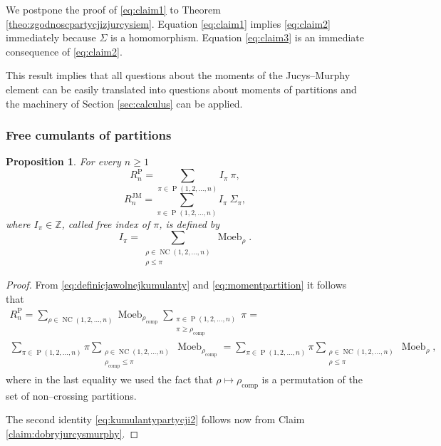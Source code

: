 \documentclass[12pt,dvips]{amsart}
\numberwithin{equation}{section} \numberwithin{figure}{section}
\theoremstyle{plain}
\newtheorem{proposition}[lemma]{Proposition}
\theoremstyle{definition}
\theoremstyle{remark}
\newcommand{\Z}{{\mathbb{Z}}}
\newcommand{\Mpp}{M^{\pp}}
\newcommand{\RJM}{R^{\JM}}
\newcommand{\Rpp}{R^{\pp}}
\DeclareMathOperator{\comp}{comp}
\DeclareMathOperator{\JM}{JM}
\DeclareMathOperator{\pp}{P}
\DeclareMathOperator{\PP}{P}
\DeclareMathOperator{\NC}{NC}
\DeclareMathOperator{\Moeb}{Moeb}
\begin{document}
We postpone the proof of \eqref{eq:claim1} to Theorem
\ref{theo:zgodnoscpartycjizjurcysiem}. Equation \eqref{eq:claim1}
implies \eqref{eq:claim2} immediately because  $\Sigma$ is a
homomorphism. Equation \eqref{eq:claim3} is an immediate consequence
of \eqref{eq:claim2}.

This result implies that all questions about the moments of the
Jucys--Murphy element can be easily translated into questions about
moments of partitions and the machinery of Section
\ref{sec:calculus} can be applied.





\subsubsection{Free cumulants of partitions}



\begin{proposition}  For every $n\geq 1$
\begin{equation}
\label{eq:kumulantypartycji} \Rpp_n=\sum_{\pi\in\PP(1,2,\dots,n)}
I_{\pi} \  \pi,
\end{equation}
\begin{equation}
\label{eq:kumulantypartycji2} \RJM_n=\sum_{\pi\in\PP(1,2,\dots,n)}
I_{\pi} \  \Sigma_\pi,
\end{equation}
where $I_{\pi}\in\Z$, called  free index
of $\pi$, is defined by
\begin{equation}
\label{eq:formulanakrotnosc}
I_{\pi}=\sum_{\substack{\rho\in\NC(1,2,\dots,n) \\ \rho\leq \pi}}
\Moeb_{\rho}.
\end{equation}
\end{proposition}
\begin{proof} From \eqref{eq:definicjawolnejkumulanty} and
\eqref{eq:momentpartition} it follows that
\begin{multline*}
\Rpp_n=\sum_{\rho\in\NC(1,2,\dots,n)} \Moeb_{\rho_{\comp}}
\sum_{\substack{\pi\in\PP(1,2,\dots,n)\\ \pi\geq \rho_{\comp}} }
\pi=\\
\sum_{\pi\in\PP(1,2,\dots,n)} \pi
\sum_{\substack{\rho\in\NC(1,2,\dots,n) \\ \rho_{\comp} \leq \pi}}
\Moeb_{\rho_{\comp}}= \sum_{\pi\in\PP(1,2,\dots,n)} \pi
\sum_{\substack{\rho\in\NC(1,2,\dots,n) \\ \rho \leq \pi}}
\Moeb_{\rho},
\end{multline*}
where in the last equality we used the fact that
$\rho\mapsto\rho_{\comp}$ is a permutation of the set of
non--crossing partitions.

The second identity \eqref{eq:kumulantypartycji2} follows now from
Claim \ref{claim:dobryjurcysmurphy}. \end{proof}
\end{document}
